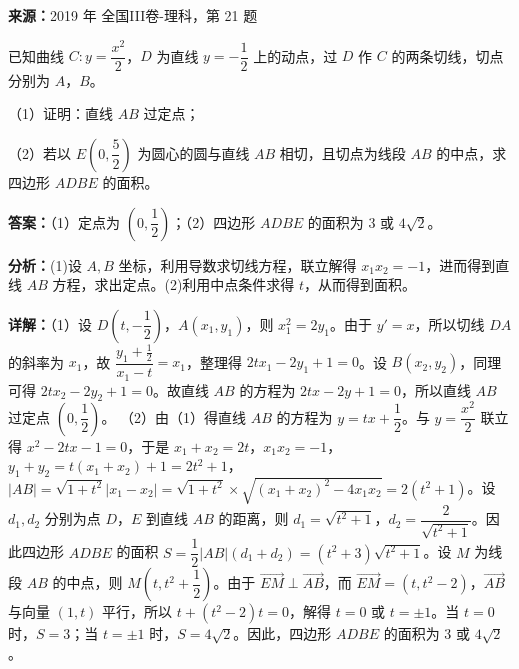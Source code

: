 \begin{question}[points=12]
\textbf{来源：}2019 年 全国III卷-理科，第 21 题\par
已知曲线 $C: y=\dfrac{x^2}{2}$，$D$ 为直线 $y=-\dfrac{1}{2}$ 上的动点，过 $D$ 作 $C$ 的两条切线，切点分别为 $A$，$B$。

（1）证明：直线 $AB$ 过定点；

（2）若以 $E\left(0,\dfrac{5}{2}\right)$ 为圆心的圆与直线 $AB$ 相切，且切点为线段 $AB$ 的中点，求四边形 $ADBE$ 的面积。
\begin{solution}
\textbf{答案：}（1）定点为 $\left(0,\dfrac{1}{2}\right)$；（2）四边形 $ADBE$ 的面积为 $3$ 或 $4\sqrt{2}$。

\textbf{分析：}(1)设 $A,B$ 坐标，利用导数求切线方程，联立解得 $x_1x_2=-1$，进而得到直线 $AB$ 方程，求出定点。(2)利用中点条件求得 $t$，从而得到面积。

\textbf{详解：}（1）设 $D\left(t,-\dfrac{1}{2}\right)$，$A(x_1,y_1)$，则 $x_1^2=2y_1$。由于 $y'=x$，所以切线 $DA$ 的斜率为 $x_1$，故 $\dfrac{y_1+\frac{1}{2}}{x_1-t}=x_1$，整理得 $2tx_1-2y_1+1=0$。设 $B(x_2,y_2)$，同理可得 $2tx_2-2y_2+1=0$。故直线 $AB$ 的方程为 $2tx-2y+1=0$，所以直线 $AB$ 过定点 $\left(0,\dfrac{1}{2}\right)$。
（2）由（1）得直线 $AB$ 的方程为 $y=tx+\dfrac{1}{2}$。与 $y=\dfrac{x^2}{2}$ 联立得 $x^2-2tx-1=0$，于是 $x_1+x_2=2t$，$x_1x_2=-1$，$y_1+y_2=t(x_1+x_2)+1=2t^2+1$，$|AB|=\sqrt{1+t^2}|x_1-x_2|=\sqrt{1+t^2}\times\sqrt{(x_1+x_2)^2-4x_1x_2}=2(t^2+1)$。设 $d_1,d_2$ 分别为点 $D$，$E$ 到直线 $AB$ 的距离，则 $d_1=\sqrt{t^2+1}$，$d_2=\dfrac{2}{\sqrt{t^2+1}}$。因此四边形 $ADBE$ 的面积 $S=\dfrac{1}{2}|AB|(d_1+d_2)=(t^2+3)\sqrt{t^2+1}$。设 $M$ 为线段 $AB$ 的中点，则 $M\left(t,t^2+\dfrac{1}{2}\right)$。由于 $\overrightarrow{EM}\perp\overrightarrow{AB}$，而 $\overrightarrow{EM}=(t,t^2-2)$，$\overrightarrow{AB}$ 与向量 $(1,t)$ 平行，所以 $t+(t^2-2)t=0$，解得 $t=0$ 或 $t=\pm1$。当 $t=0$ 时，$S=3$；当 $t=\pm1$ 时，$S=4\sqrt{2}$。因此，四边形 $ADBE$ 的面积为 $3$ 或 $4\sqrt{2}$。
\end{solution}
\end{question}

